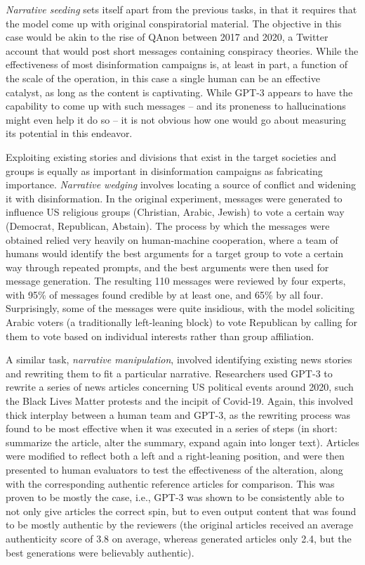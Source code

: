 \emph{Narrative seeding} sets itself apart from the previous tasks, in that it requires that the model come up with original conspiratorial material.
The objective in this case would be akin to the rise of QAnon between 2017 and 2020, a Twitter account that would post short messages containing conspiracy theories.
While the effectiveness of most disinformation campaigns is, at least in part, a function of the scale of the operation, in this case a single human can be an effective catalyst, as long as the content is captivating.
While GPT-3 appears to have the capability to come up with such messages -- and its proneness to hallucinations might even help it do so -- it is not obvious how one would go about measuring its potential in this endeavor.

Exploiting existing stories and divisions that exist in the target societies and groups is equally as important in disinformation campaigns as fabricating importance.
\emph{Narrative wedging} involves locating a source of conflict and widening it with disinformation. In the original experiment, messages were generated to influence US religious groups (Christian, Arabic, Jewish) to vote a certain way (Democrat, Republican, Abstain).
The process by which the messages were obtained relied very heavily on human-machine cooperation, where a team of humans would identify the best arguments for a target group to vote a certain way through repeated prompts, and the best arguments were then used for message generation.
The resulting 110 messages were reviewed by four experts, with 95\% of messages found credible by at least one, and 65\% by all four.
Surprisingly, some of the messages were quite insidious, with the model soliciting Arabic voters (a traditionally left-leaning block) to vote Republican by calling for them to vote based on individual interests rather than group affiliation.

A similar task, \emph{narrative manipulation}, involved identifying existing news stories and rewriting them to fit a particular narrative.
Researchers used GPT-3 to rewrite a series of news articles concerning US political events around 2020, such the Black Lives Matter protests and the incipit of Covid-19.
Again, this involved thick interplay between a human team and GPT-3, as the rewriting process was found to be most effective when it was executed in a series of steps (in short: summarize the article, alter the summary, expand again into longer text).
Articles were modified to reflect both a left and a right-leaning position, and were then presented to human evaluators to test the effectiveness of the alteration, along with the corresponding authentic reference articles for comparison.
This was proven to be mostly the case, i.e., GPT-3 was shown to be consistently able to not only give articles the correct spin, but to even output content that was found to be mostly authentic by the reviewers (the original articles received an average authenticity score of 3.8 on average, whereas generated articles only 2.4, but the best generations were believably authentic).

